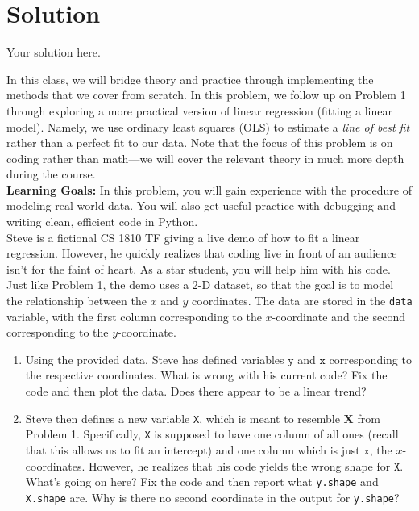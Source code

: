 \documentclass{../harvardml}
\theoremstyle{definition}
\theoremstyle{plain}
\newenvironment{solution}
  {\color{blue}\section*{Solution}}
{}
\begin{document}
\newpage

\begin{solution}
	Your solution here.
\end{solution} 

\newpage 

\begin{problem} 
In this class, we will bridge theory and practice through implementing the methods that we cover from scratch. In this problem, we follow up on Problem 1 through exploring a more practical version of linear regression (fitting a linear model). Namely, we use ordinary least squares (OLS) to estimate a \textit{line of best fit} rather than a perfect fit to our data. Note that the focus of this problem is on coding rather than math---we will cover the relevant theory in much more depth during the course.\\

\noindent \textbf{Learning Goals:} In this problem, you will gain experience with the procedure of modeling real-world data. You will also get useful practice with debugging and writing clean, efficient code in Python. \\

\noindent Steve is a fictional CS 1810 TF giving a live demo of how to fit a linear regression. However, he quickly realizes that coding live in front of an audience isn't for the faint of heart. As a star student, you will help him with his code. Just like Problem 1, the demo uses a 2-D dataset, so that the goal is to model the relationship between the $x$ and $y$ coordinates. The data are stored in the \texttt{data} variable, with the first column corresponding to the $x$-coordinate and the second corresponding to the $y$-coordinate. 

\begin{enumerate}
    \item Using the provided data, Steve has defined variables $\texttt{y}$ and $\texttt{x}$ corresponding to the respective coordinates.  What is wrong with his current code? Fix the code and then plot the data. Does there appear to be a linear trend?

    \item Steve then defines a new variable \texttt{X}, which is meant to resemble $\bm X$ from Problem 1. Specifically, \texttt{X} is supposed to have one column of all ones (recall that this allows us to fit an intercept) and one column which is just $\texttt{x}$, the $x$-coordinates. However, he realizes that his code yields the wrong shape for $\texttt{X}$. What's going on here? Fix the code and then report what \texttt{y.shape} and \texttt{X.shape} are. Why is there no second coordinate in the output for \texttt{y.shape}?
    

\end{enumerate}
\end{problem}
\end{document}
